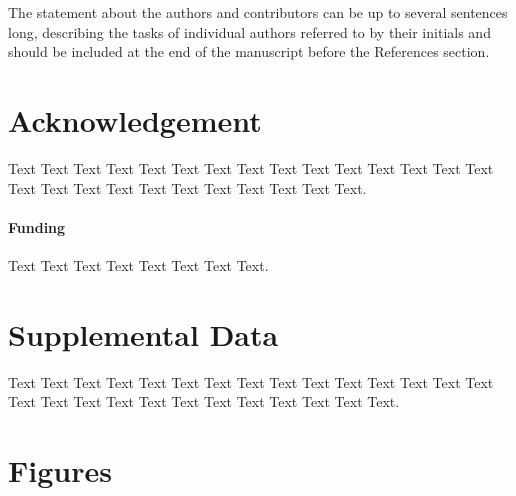 \documentclass{frontiersSCNS} %
\begin{document}
The statement about the authors and contributors can be up to several sentences long, describing the tasks of individual authors referred to by their initials and should be included at the end of the manuscript before the References section.


\section*{Acknowledgement}
Text Text Text Text Text Text  Text Text Text Text Text Text Text Text  Text Text Text Text Text Text Text Text Text  Text Text Text.

\paragraph{Funding\textcolon} Text Text Text Text Text Text  Text Text.

\section*{Supplemental Data}
Text Text Text Text Text Text  Text Text Text Text Text Text Text Text Text  Text Text Text Text Text Text Text Text Text  Text Text Text.



\section*{Figures}


\end{document}
